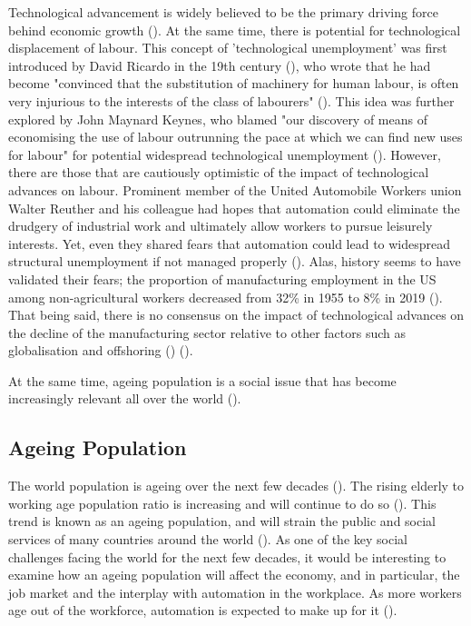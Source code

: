 \documentclass[11pt]{article}
\begin{document}
Technological advancement is widely believed to be the primary driving force behind economic growth (\cite{RePEc:ssa:lembks:dosietal-1988}). At the same time, there is potential for technological displacement of labour. This concept of 'technological unemployment' was first introduced by David Ricardo in the 19th century (\cite{WoirolGregoryR1997Ttua}), who wrote that he had become "convinced that the substitution of machinery for human labour, is often very injurious to the interests of the class of labourers" (\cite{10.1257/jep.33.2.229}). This idea was further explored by John Maynard Keynes, who blamed "our discovery of means of economising the use of labour outrunning the pace at which we can find new uses for labour" for potential widespread technological unemployment (\cite{Keynes2010}). However, there are those that are cautiously optimistic of the impact of technological advances on labour. Prominent member of the United Automobile Workers union Walter Reuther and his colleague had hopes that automation could eliminate the drudgery of industrial work and ultimately allow workers to pursue leisurely interests. Yet, even they shared fears that automation could lead to widespread structural unemployment if not managed properly (\cite{SteigerwaldDavid2010WRtU}). Alas, history seems to have validated their fears; the proportion of manufacturing employment in the US among non-agricultural workers decreased from 32\% in 1955 to 8\% in 2019 (\cite{rose_2021}). That being said, there is no consensus on the impact of technological advances on the decline of the manufacturing sector relative to other factors such as globalisation and offshoring (\cite{RoseElizabethL.2021TDoU}) (\cite{krugman2019globalization}).

At the same time, ageing population is a social issue that has become increasingly relevant all over the world (\cite{2002Wpa1}).

\subsection{Ageing Population}
\label{subsec:ageingpopulation}

The world population is ageing over the next few decades (\cite{science}). The rising elderly to working age population ratio is increasing and will continue to do so (\cite{WHO}). This trend is known as an ageing population, and will strain the public and social services of many countries around the world (\cite{publicservicesstrain}). As one of the key social challenges facing the world for the next few decades, it would be interesting to examine how an ageing population will affect the economy, and in particular, the job market and the interplay with automation in the workplace. As more workers age out of the workforce, automation is expected to make up for it (\cite{futureofemployment}).
\end{document}
